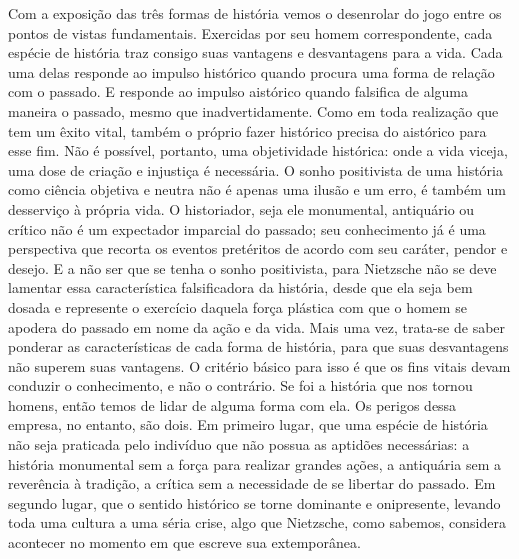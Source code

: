 Com a exposição das três formas de história vemos o desenrolar do jogo
entre os pontos de vistas fundamentais. Exercidas por seu homem
correspondente, cada espécie de história traz consigo suas vantagens e
desvantagens para a vida. Cada uma delas responde ao impulso histórico
quando procura uma forma de relação com o passado. E responde ao impulso
aistórico quando falsifica de alguma maneira o passado, mesmo que
inadvertidamente. Como em toda realização que tem um êxito vital, também
o próprio fazer histórico precisa do aistórico para esse fim. Não é
possível, portanto, uma objetividade histórica: onde a vida viceja, uma
dose de criação e injustiça é necessária. O sonho positivista de uma
história como ciência objetiva e neutra não é apenas uma ilusão e um
erro, é também um desserviço à própria vida. O historiador, seja ele
monumental, antiquário ou crítico não é um expectador imparcial do
passado; seu conhecimento já é uma perspectiva que recorta os eventos
pretéritos de acordo com seu caráter, pendor e desejo. E a não ser que
se tenha o sonho positivista, para Nietzsche não se deve lamentar essa
característica falsificadora da história, desde que ela seja bem dosada
e represente o exercício daquela força plástica com que o homem se
apodera do passado em nome da ação e da vida. Mais uma vez, trata-se de
saber ponderar as características de cada forma de história, para que
suas desvantagens não superem suas vantagens. O critério básico para
isso é que os fins vitais devam conduzir o conhecimento, e não o
contrário. Se foi a história que nos tornou homens, então temos de lidar
de alguma forma com ela. Os perigos dessa empresa, no entanto, são dois.
Em primeiro lugar, que uma espécie de história não seja praticada pelo
indivíduo que não possua as aptidões necessárias: a história monumental
sem a força para realizar grandes ações, a antiquária sem a reverência à
tradição, a crítica sem a necessidade de se libertar do passado. Em
segundo lugar, que o sentido histórico se torne dominante e onipresente,
levando toda uma cultura a uma séria crise, algo que Nietzsche, como
sabemos, considera acontecer no momento em que escreve sua extemporânea.

